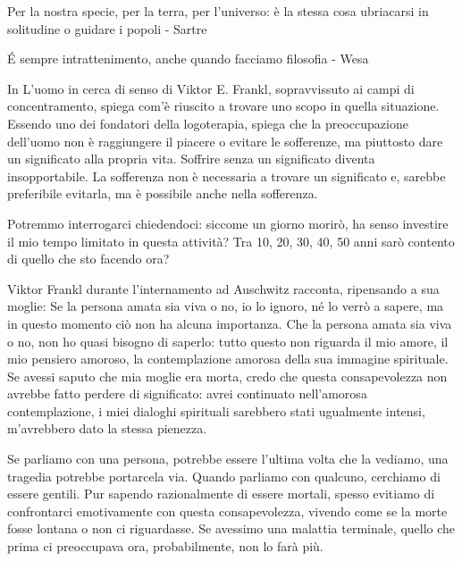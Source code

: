 \documentclass[12pt]{book} %
\begin{document}
Per la nostra specie, per la terra, per l'universo: è la stessa cosa ubriacarsi in solitudine o guidare i popoli - Sartre 

É sempre intrattenimento, anche quando facciamo filosofia - Wesa

In L'uomo in cerca di senso di Viktor E. Frankl, sopravvissuto ai campi di concentramento, spiega com'è riuscito a trovare uno scopo in quella situazione. Essendo uno dei fondatori della logoterapia, spiega che la preoccupazione dell'uomo non è raggiungere il piacere o evitare le sofferenze, ma piuttosto dare un significato alla propria vita. Soffrire senza un significato diventa insopportabile. La sofferenza non è necessaria a trovare un significato e, sarebbe preferibile evitarla, ma è possibile anche nella sofferenza.

Potremmo interrogarci chiedendoci: siccome un giorno morirò, ha senso investire il mio tempo limitato in questa attività? Tra 10, 20, 30, 40, 50 anni sarò contento di quello che sto facendo ora?

Viktor Frankl durante l'internamento ad Auschwitz racconta, ripensando a sua moglie: Se la persona amata sia viva o no, io lo ignoro, né lo verrò a sapere, ma in questo momento ciò non ha alcuna importanza. Che la persona amata sia viva o no, non ho quasi bisogno di saperlo: tutto questo non riguarda il mio amore, il mio pensiero amoroso, la contemplazione amorosa della sua immagine spirituale. Se avessi saputo che mia moglie era morta, credo che questa consapevolezza non avrebbe fatto perdere di significato: avrei continuato nell'amorosa contemplazione, i miei dialoghi spirituali sarebbero stati ugualmente intensi, m'avrebbero dato la stessa pienezza. 

Se parliamo con una persona, potrebbe essere l'ultima volta che la vediamo, una tragedia potrebbe
portarcela via. Quando parliamo con qualcuno, cerchiamo di essere gentili.
Pur sapendo razionalmente di essere mortali, spesso evitiamo di confrontarci emotivamente con questa consapevolezza, vivendo come se la morte fosse lontana o non ci riguardasse. Se avessimo una malattia terminale, quello che prima ci preoccupava ora, probabilmente, non lo farà più. 
\end{document}
